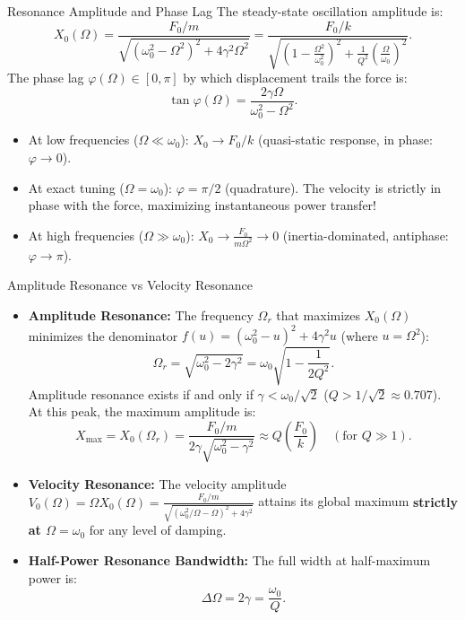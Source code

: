 \begin{lawbox}{Resonance Amplitude and Phase Lag}
The steady-state oscillation amplitude is:
\begin{equation}
X_0(\Omega) = \frac{F_0 / m}{\sqrt{(\omega_0^2 - \Omega^2)^2 + 4\gamma^2\Omega^2}} = \frac{F_0 / k}{\sqrt{\left(1 - \frac{\Omega^2}{\omega_0^2}\right)^2 + \frac{1}{Q^2}\left(\frac{\Omega}{\omega_0}\right)^2}}.
\end{equation}
The phase lag $\varphi(\Omega) \in [0, \pi]$ by which displacement trails the force is:
\begin{equation}
\tan\varphi(\Omega) = \frac{2\gamma\Omega}{\omega_0^2 - \Omega^2}.
\end{equation}
\begin{itemize}[leftmargin=1.5em,itemsep=2pt]
  \item At low frequencies ($\Omega \ll \omega_0$): $X_0 \to F_0/k$ (quasi-static response, in phase: $\varphi \to 0$).
  \item At exact tuning ($\Omega = \omega_0$): $\varphi = \pi/2$ (quadrature). The velocity is strictly in phase with the force, maximizing instantaneous power transfer!
  \item At high frequencies ($\Omega \gg \omega_0$): $X_0 \to \frac{F_0}{m\Omega^2} \to 0$ (inertia-dominated, antiphase: $\varphi \to \pi$).
\end{itemize}
\end{lawbox}

\begin{definitionbox}{Amplitude Resonance vs Velocity Resonance}
\begin{itemize}[leftmargin=1.5em,itemsep=3pt]
  \item \textbf{Amplitude Resonance:} The frequency $\Omega_r$ that maximizes $X_0(\Omega)$ minimizes the denominator $f(u) = (\omega_0^2 - u)^2 + 4\gamma^2 u$ (where $u = \Omega^2$):
  \begin{equation}
  \Omega_r = \sqrt{\omega_0^2 - 2\gamma^2} = \omega_0 \sqrt{1 - \frac{1}{2Q^2}}.
  \end{equation}
  Amplitude resonance exists if and only if $\gamma < \omega_0/\sqrt{2}$ ($Q > 1/\sqrt{2} \approx 0.707$).
  At this peak, the maximum amplitude is:
  \begin{equation}
  X_{\max} = X_0(\Omega_r) = \frac{F_0 / m}{2\gamma\sqrt{\omega_0^2 - \gamma^2}} \approx Q \left(\frac{F_0}{k}\right) \quad (\text{for } Q \gg 1).
  \end{equation}
  \item \textbf{Velocity Resonance:} The velocity amplitude $V_0(\Omega) = \Omega X_0(\Omega) = \frac{F_0/m}{\sqrt{(\omega_0^2/\Omega - \Omega)^2 + 4\gamma^2}}$ attains its global maximum \textbf{strictly at $\Omega = \omega_0$} for any level of damping.
  \item \textbf{Half-Power Resonance Bandwidth:} The full width at half-maximum power is:
  \begin{equation}
  \Delta\Omega = 2\gamma = \frac{\omega_0}{Q}.
  \end{equation}
\end{itemize}
\end{definitionbox}

